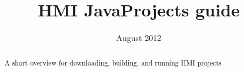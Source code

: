 \documentclass[10pt,oneside]{memoir}
\begin{document}
\title{HMI JavaProjects guide}
\date{August 2012}
\author{}



\maketitle{}
\def\abstractname{}
\begin{abstract}
A short overview for downloading, building, and running HMI projects
\end{abstract}



%
%
%
%
%
%






\end{document}

